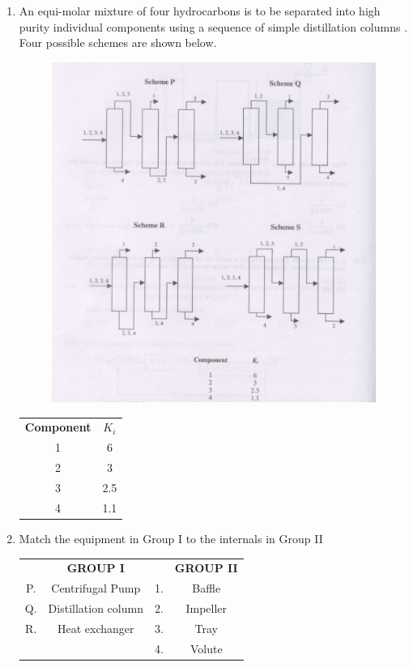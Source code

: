 \documentclass[journal,12pt,onecolumn]{IEEEtran}
\theoremstyle{remark}
\begin{document}
\begin{enumerate}
		\item An equi-molar mixture of four hydrocarbons  is to be separated into high purity individual components using a sequence of simple distillation columns . Four possible schemes are shown below.
		\begin{figure}[H]
			\centering
			\includegraphics[width = 0.7\columnwidth]{q46.png}
			\caption{}
			\label{fig:Q46}
		\end{figure}
		\begin{center}
			\begin{tabular}{ c c }
				\textbf{Component} &\textbf{$K_{i}$} \\
				1 & 6 \\
				2 & 3 \\
				3 & 2.5 \\
				4 & 1.1
			\end{tabular}
		\end{center} 
		
		\begin{enumerate}
		\end{enumerate} 
		
		\hfill {}
		
		
		\item Match the equipment in Group I to the internals in Group II 
		\begin{center}
			\begin{tabular}{ c c c c }
				& \textbf{GROUP I} &  &\textbf{GROUP II} \\
				P. & Centrifugal Pump & 1. & Baffle \\
				Q. & Distillation column & 2. & Impeller \\
				R. & Heat exchanger & 3. & Tray \\
				& & 4. & Volute
			\end{tabular}
		\end{center} 
		

\end{enumerate}
\end{document}
